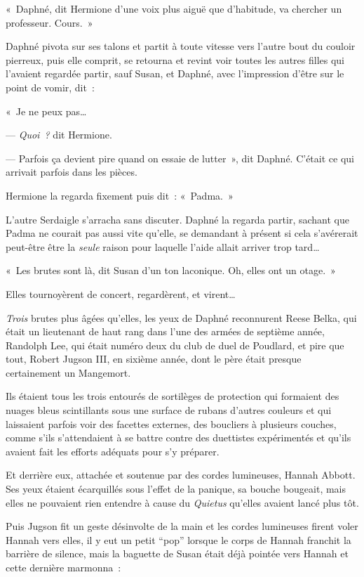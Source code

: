 «~Daphné, dit Hermione d'une voix plus aiguë que d'habitude, va chercher un professeur.
Cours.~»

Daphné pivota sur ses talons et partit à toute vitesse vers l'autre bout du couloir pierreux, puis elle comprit, se retourna et revint voir toutes les autres filles qui l'avaient regardée partir, sauf Susan, et Daphné, avec l'impression d'être sur le point de vomir, dit~:

«~Je ne peux pas…

--- \emph{Quoi~?} dit Hermione.

--- Parfois ça devient pire quand on essaie de lutter~», dit Daphné.
C'était ce qui arrivait parfois dans les pièces.

Hermione la regarda fixement puis dit~: «~Padma.~»

L'autre Serdaigle s'arracha sans discuter.
Daphné la regarda partir, sachant que Padma ne courait pas aussi vite qu'elle, se demandant à présent si cela s'avérerait peut-être être la \emph{seule} raison pour laquelle l'aide allait arriver trop tard…

«~Les brutes sont là, dit Susan d'un ton laconique.
Oh, elles ont un otage.~»

Elles tournoyèrent de concert, regardèrent, et virent…

\emph{Trois} brutes plus âgées qu'elles, les yeux de Daphné reconnurent Reese Belka, qui était un lieutenant de haut rang dans l'une des armées de septième année, Randolph Lee, qui était numéro deux du club de duel de Poudlard, et pire que tout, Robert Jugson III, en sixième année, dont le père était presque certainement un Mangemort.

Ils étaient tous les trois entourés de sortilèges de protection qui formaient des nuages bleus scintillants sous une surface de rubans d'autres couleurs et qui laissaient parfois voir des facettes externes, des boucliers à plusieurs couches, comme s'ils s'attendaient à se battre contre des duettistes expérimentés et qu'ils avaient fait les efforts adéquats pour s'y préparer.

Et derrière eux, attachée et soutenue par des cordes lumineuses, Hannah Abbott.
Ses yeux étaient écarquillés sous l'effet de la panique, sa bouche bougeait, mais elles ne pouvaient rien entendre à cause du \emph{Quietus} qu'elles avaient lancé plus tôt.

Puis Jugson fit un geste désinvolte de la main et les cordes lumineuses firent voler Hannah vers elles, il y eut un petit “pop” lorsque le corps de Hannah franchit la barrière de silence, mais la baguette de Susan était déjà pointée vers Hannah et cette dernière marmonna~:

